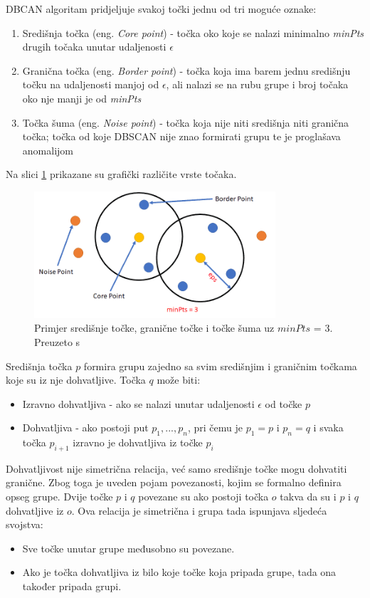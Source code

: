 \documentclass[utf8, diplomski, numeric]{fer}
\begin{document}
DBCAN algoritam pridjeljuje svakoj točki jednu od tri moguće oznake:
\begin{enumerate}
\item Središnja točka (eng. \textit{Core point}) - točka oko koje se nalazi minimalno \textit{minPts} drugih točaka unutar udaljenosti $\epsilon$
\item Granična točka (eng. \textit{Border point}) - točka koja ima barem jednu središnju točku na udaljenosti manjoj od $\epsilon$, ali nalazi se na rubu grupe i broj točaka oko nje manji je od \textit{minPts} 
\item Točka šuma (eng. \textit{Noise point}) - točka koja nije niti središnja niti granična točka; točka od koje DBSCAN nije znao formirati grupu te je proglašava anomalijom
\end{enumerate}

Na slici \ref{fig:dbscan-points} prikazane su grafički različite vrste točaka.

\begin{figure}[htb]
\includegraphics[width=0.8\textwidth]{images/dbscan-points.png}
\centering
\caption{Primjer središnje točke, granične točke i točke šuma uz $minPts$ = 3. Preuzeto s  \cite{DBSCANClustering}}
\label{fig:dbscan-points}
\end{figure}

Središnja točka $p$ formira grupu zajedno sa svim središnjim i graničnim točkama koje su iz nje dohvatljive. Točka $q$ može biti:
\begin{itemize}
\item Izravno dohvatljiva - ako se nalazi unutar udaljenosti $\epsilon$ od točke $p$
\item Dohvatljiva - ako postoji put $p_1, ..., p_n$, pri čemu je $p_1 = p$ i $p_n = q$ i svaka točka $p_{i+1}$ izravno je dohvatljiva iz točke $p_i$
\end{itemize}

Dohvatljivost nije simetrična relacija, već samo središnje točke mogu dohvatiti granične. Zbog toga je uveden pojam povezanosti, kojim se formalno definira opseg grupe. Dvije točke $p$ i $q$ povezane su ako postoji točka $o$ takva da su i $p$ i $q$ dohvatljive iz $o$. Ova relacija je simetrična i grupa tada ispunjava sljedeća svojstva:
\begin{itemize}
\item Sve točke unutar grupe međusobno su povezane.
\item Ako je točka dohvatljiva iz bilo koje točke koja pripada grupe, tada ona također pripada grupi.
\end{itemize}
\end{document}
